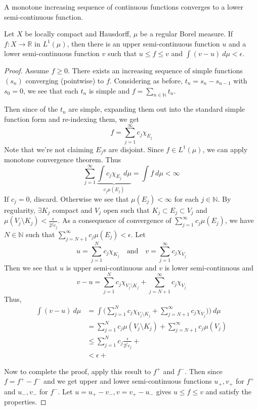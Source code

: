 \begin{corollary}
  A monotone increasing sequence of continuous functions converges to
  a lower semi-continuous function.
\end{corollary}

\begin{theorem}
  Let $X$ be locally compact and Hausdorff, $\mu$ be a regular Borel
  measure. If $f: X \to \mathbb{R}$ in $L^1(\mu)$, then there is an
  upper semi-continuous function $u$ and a lower semi-continuous
  function $v$ such that $u \le f \le v$ and $\int(v-u) \ d \mu < \epsilon$.
\end{theorem}
\begin{proof}
  Assume $f \ge 0$. There exists an increasing sequence of simple functions
  $(s_n)$ converging (pointwise) to $f$. Considering  as before,
  $t_n = s_n - s_{n-1}$ with $s_0 = 0$, we see that each $t_n$ is
  simple and $f = \sum_{n \in \mathbb{N}} t_n$.

  Then since of the $t_n$ are simple, expanding them out into the
  standard simple function form and re-indexing them, we get  \[
    f = \sum_{j = 1}^{\infty}  c_j \chi_{E_j}
  \]
  Note that we're not claiming $E_j$s are disjoint. Since $ f \in
  L^1(\mu)$, we can apply monotone convergence theorem. Thus \[
    \sum_{j = 1}^{\infty} \underbrace{ \int c_j \chi_{E_j} \ d \mu
    }_{c_j \mu(E_j)} = \int  f \ d \mu < \infty
  \]
  If $c_j = 0$, discard. Otherwise we see that $\mu(E_j) < \infty$
  for each $j \in \mathbb{N}$. By regularity, $\exists K_j$ compact
  and $ V_j$ open such that $K_j \subset E_j \subset V_j$ and $
  \mu(V_j \setminus K_j) < \frac{\epsilon}{2^jc_j}$. As a consequence
  of convergence of $ \sum_{j = 1}^{\infty}  c_j \mu(E_j)$, we have
  $N \in \mathbb{N}$ such that $ \sum_{j = N+1}^{\infty}  c_j
  \mu(E_j) < \epsilon$. Let \[
    u = \sum_{j = 1}^{N} c_j \chi_{K_j} \quad \textrm{and} \quad v =
    \sum_{j = 1}^{\infty} c_j \chi_{V_j}
  \]
  Then we see that $u$ is upper semi-continuous and $v$ is lower
  semi-continuous and  \[
    v - u = \sum_{j = 1}^{N} c_j \chi_{V_j \setminus K_j} + \sum_{ j
    = N+1}^{\infty}  c_j \chi_{V_j}
  \]
  Thus,
  \begin{align*}
    \int  (v- u) \ d \mu &= \int \big( \sum_{j = 1}^{N} c_j \chi_{V_j
  \setminus K_j} + \sum_{ j = N+1}^{\infty}  c_j \chi_{V_j}\big)) \ d \mu \\
  &= \sum_{j = 1}^{N} c_j \mu(V_j\setminus K_j) + \sum_{ j =
  N+1}^{\infty}  c_j \mu(V_j) \\
  & \le \sum_{j = 1}^{N} c_j \frac{\epsilon}{2^jc_j} +    \\
  & < \epsilon +
\end{align*}

Now to complete the proof, apply this result to $f^+$ and $f^-$. Then
since $f = f^+ - f^-$ and we get upper and lower semi-continuous
functions $u_+, v_+$ for $f^+$ and $u_{-}, v_-$ for $f^-$. Let $u =
u_+ - v_-, v = v_+ - u_-$ gives $u \le f \le v$ and satisfy the properties.
\end{proof}


